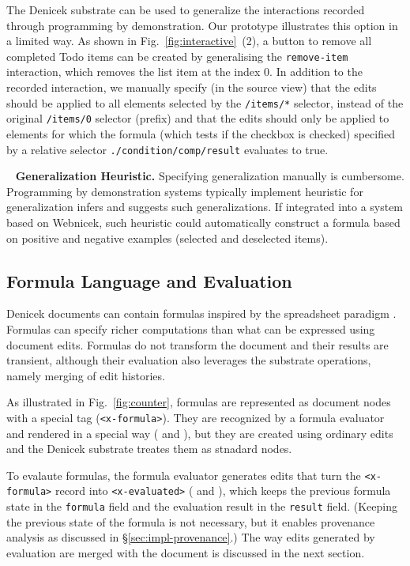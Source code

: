 \documentclass[sigconf,anonymous,screen]{acmart}
\newcommand*\circled[1]{\textnormal{\footnotesize\sffamily\bfseries\protect\tikz[baseline=(char.base)]{
  \node[shape=circle,fill=black,text=white,draw,inner sep=1pt] (char) {#1};}}}
\DeclareRobustCommand{\keyideabox}[3]{\begin{tcolorbox}[breakable,
  boxsep=5pt,left=0pt,right=0pt,top=0pt,bottom=0pt,width=\dimexpr\columnwidth\relax,
  colback=gray!20,colframe=gray!20,
  enlarge bottom by=0pt,enlarge top by=0pt,
  arc=0pt,outer arc=0pt]
\lettrine[lraise=0.3]{\LARGE #1}{~}
\small \textbf{#2.} #3
\end{tcolorbox}
}
\begin{document}
The Denicek substrate can be used to generalize the interactions recorded through programming by
demonstration. Our prototype illustrates this option in a limited way. As shown in
Fig.~\ref{fig:interactive}~(2), a button to remove all completed Todo items can be created by
generalising the {\small\Verb_remove-item_} interaction, which removes the list item at the index 0.
In addition to the recorded interaction, we manually specify (in the source view) that the edits
should be applied to all elements selected by the {\small\Verb_/items/*_} selector, instead of
the original {\small\Verb_/items/0_} selector (prefix) and that the edits should only be
applied to elements for which the formula (which tests if the checkbox is checked) specified by a
relative selector {\small\Verb_./condition/comp/result_} evaluates to true.

\keyideabox{\faMagic}{Generalization Heuristic}{Specifying generalization manually is cumbersome.
Programming by demonstration systems typically implement heuristic for generalization
\cite{myers-2000-intelligence} infers and suggests such generalizations. If integrated into
a system based on Webnicek, such heuristic could automatically construct a formula
based on positive and negative examples \cite{gulwani-2014-flash} (selected and deselected items).}


\subsection{Formula Language and Evaluation}
\label{sec:impl-eval}

Denicek documents can contain formulas inspired by the spreadsheet
paradigm \cite{nardi-1990-spreadsheets}. Formulas can specify richer computations than
what can be expressed using document edits. Formulas do not transform the document and their
results are transient, although their evaluation also leverages the substrate operations,
namely merging of edit histories.

As illustrated in Fig.~\ref{fig:counter}, formulas are represented as document nodes with a
special tag ({\small\Verb_<x-formula>_}). They are recognized by a formula evaluator and
rendered in a special way (\circled{1} and \circled{4}), but they are created using ordinary
edits and the Denicek substrate treates them as stnadard nodes.

To evalaute formulas, the formula evaluator generates edits that turn the {\small\Verb_<x-formula>_}
record into {\small\Verb_<x-evaluated>_} (\circled{2} and \circled{3}), which keeps the previous
formula state in the {\small\Verb_formula_} field and the evaluation result in the {\small\Verb_result_} field.
(Keeping the previous state of the formula is not necessary, but it enables provenance analysis
as discussed in \S\ref{sec:impl-provenance}.) The way edits generated by evaluation are merged
with the document is discussed in the next section.
\end{document}
